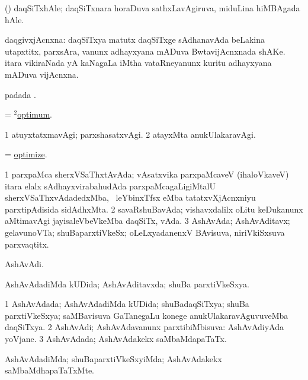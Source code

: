 \bentry
{}
\gl{\nA}
\bmng
(\aMrashA) daqSiTxhAle; daqSiTxnara horaDuva sathxLavAgiruva, miduLina hiMBAgada hAle. 
\emng
\eentry

\bentry
{}
\gl{\nA}
\bmng
daqgivxjAcnxna: 
\banum
{} daqSiTxya matutx daqSiTxge sAdhanavAda beLakina utapxtitx, parxsAra, \mo vanunx adhayxyana mADuva BwtavijAcnxnada shAKe. 
 itara vikiraNada yA kaNagaLa iMtha vataRneyanunx kuritu adhayxyana mADuva vijAcnxna. 
\eanum
\emng
\eentry

\bentry
{}
\gl{\nA}
\bmng
{} padada \bava. 
\emng
\eentry

\bentry
{}
\gl{\gu}
\bmng
= \hyperlink{optimum(2)}{$^2$optimum}. 
\emng
\eentry

\bentry
{}
\gl{\kirxvi}
\bmng
\bnum
\num{1} atuyxtatxmavAgi; parxshasatxvAgi. 
\num{2} atayxMta anukUlakaravAgi. 
\enum
\emng
\eentry

\bentry
{}
\gl{\kirx}
\bmng
= \hyperlink{optimize}{optimize}. 
\emng
\eentry

\bentry
{}
\gl{\nA}
\bmng
\bnum
\num{1} parxpaMca sherxVSaThxtAvAda; vAsatxvika parxpaMcaveV (ihaloVkaveV) itara elalx sAdhayxvirabahudAda parxpaMcagaLigiMtalU sherxVSaThxvAdadedxMba, \kanmu\ leYbinxTfsx eMba tatatxvXjAcnxniyu parxtipAdisida sidAdhxMta. 
\num{2} savaRshuBavAda; vishavxdalilx oLitu keDukanunx aMtimavAgi jayisaleVbeVkeMba daqSiTx, vAda. 
\num{3} AshAvAda; AshAvAditavx; gelavunoVTa; shuBaparxtiVkeSx; oLeLxyadanenxV BAvisuva, niriVkiSxsuva parxvaqtitx. 
\enum
\emng
\eentry

\bentry
{}
\gl{\nA}
\bmng
AshAvAdi. 
\emng
\eentry

\bentry
{}
\gl{\gu}
\bmng
AshAvAdadiMda kUDida; AshAvAditavxda; shuBa parxtiVkeSxya. 
\emng
\eentry

\bentry
{}
\gl{\gu}
\bmng
\bnum
\num{1} AshAvAdada; AshAvAdadiMda kUDida; shuBadaqSiTxya; shuBa parxtiVkeSxya; saMBavisuva GaTanegaLu konege anukUlakaravAguvuveMba daqSiTxya. 
\num{2} AshAvAdi; AshAvAdavanunx parxtibiMbisuva:  AshAvAdiyAda yoVjane. 
\num{3} AshAvAdada; AshAvAdakekx saMbaMdapaTaTx. 
\enum
\emng
\eentry

\bentry
{}
\gl{\kirxvi}
\bmng
AshAvAdadiMda; shuBaparxtiVkeSxyiMda; AshAvAdakekx saMbaMdhapaTaTxMte. 
\emng
\eentry

